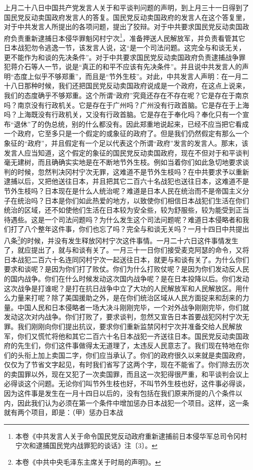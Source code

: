 \documentclass[cn,11pt,chinese]{elegantbook}
\begin{document}
上月二十八日中国共产党发言人关于和平谈判问题的声明，到上月三十一日得到了国民党反动卖国政府发言人的答复。国民党反动卖国政府的发言人在这个答复里，对于中共发言人所提出的各项问题，提出了狡辩。对于中共要求国民党反动卖国政府负责重新逮捕日本侵华罪魁冈村宁次\footnote[1]{本卷《中共发言人关于命令国民党反动政府重新逮捕前日本侵华军总司令冈村宁次和逮捕国民党内战罪犯的谈话》注〔3〕。}，准备押送人民解放军，并负责看管其它日本战犯勿令逃逸一节，该发言人说，这“是一个司法问题。这完全与和谈无关，更不能作为和谈的先决条件”。对于中共要求国民党反动卖国政府负责逮捕战争罪犯蒋介石等人一节，说是“真正的和平不应该有先决条件”。并且说中共发言人的声明“态度上似乎不够郑重”，而且是“节外生枝”。对此，中共发言人声明：在一月二十八日那种时候，我们还把国民党反动卖国政府说成是一个政府，在这点上说来，我们的态度确乎不够郑重。这个所谓“政府”究竟还存在不存在呢？它是存在于南京吗？南京没有行政机关。它是存在于广州吗？广州没有行政首脑。它是存在于上海吗？上海既没有行政机关，又没有行政首脑。它是存在于奉化吗？奉化只有一个宣布“退休”了的伪总统，别的什么都没有。因此郑重地说起来，已经不应当把它看成一个政府，它至多只是一个假定的或象征的政府了。但是我们仍然假定有那么一个象征的“政府”，并且假定有一个足以代表这个所谓“政府”发言的发言人。那末，该发言人应当知道，这个假定的象征的国民党反动卖国政府，现在不但对于和平谈判毫无建树，而且确确实实地是在不断地节外生枝。例如当着你们如此急切地要求谈判的时候，忽然判决冈村宁次无罪，这难道不是节外生枝吗？在中共要求予以重新逮捕以后，又把他送往日本，并且把其它二百六十名战犯也送往日本，这难道不是节外生枝吗？日本现在是什么人统治呢？难道是日本人民在统治而不是帝国主义分子在统治吗？日本是你们如此热爱的地方，以致使你们相信日本战犯们生活在你们统治的区域，还不如使他们生活在日本较为安全些，较为舒服些，较为能受到正当待遇些。这是一个司法问题吗？为什么发生这个司法问题呢？难道日本侵略者和我们打了八个整年这件事，你们也忘了吗？完全与和谈无关吗？一月十四日中共提出八条\footnote[2]{本卷《中共中央毛泽东主席关于时局的声明》。}的时候，并没有发生释放冈村宁次这件事情。一月二十六日这件事情发生了，就应提出了，就与和谈有关了。一月三十一日你们接受麦克阿瑟的命令，又将日本战犯二百六十名连同冈村宁次一起送往日本，就更与和谈有关了。为什么你们要求和谈呢？是因为你们打了败仗。你们为什么打败仗呢？是因为你们发动反人民的国内战争。你们在什么时候发动这次国内战争呢？是在日本投降以后。你们发动这次战争是打谁呢？是打在抗日战争中立了大功的人民解放军和人民解放区。用什么力量来打呢？除了美国援助之外，是在你们统治区域从人民方面捉来和刮来的力量。中国人民和日本侵略者一场大决斗刚刚完毕，一个对外战争刚刚完毕，你们就发动这次对内战争。你们打败了，要求谈判，忽然又宣告日本首要战犯冈村宁次无罪。我们刚刚向你们提出抗议，要求你们重新监禁冈村宁次并准备交给人民解放军，你们又慌忙将他和其它二百六十名日本战犯一齐送往日本。国民党反动卖国政府的先生们，你们这件事做得太无道理了，太违反人民意志了。我们现在特地在你们的头衔上加上卖国二字，你们应当承认了。你们的政府很久以来就是卖国政府，仅仅为了节省文字起见，有时我们省写了这两个字，现在不能省了。你们除去历次的卖国罪以外，现在又犯了一次卖国罪，而且这一次犯得很严重，和平谈判会议上必得谈这个问题。无论你们叫节外生枝也好，不叫节外生枝也好，这件事必得谈，因为这件事是发生在一月十四日以后的，没有包括在我们原来所提的八个条件以内，因此我们认为必须在第一个条件中增加惩办日本战犯一个项目。这样，这一条就有两个项目，即是：（甲）惩办日本战
\end{document}
